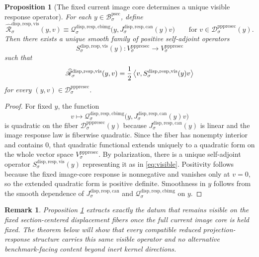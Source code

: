 \documentclass[11pt]{article}
\newcommand{\ProtoSectionBody}[1]{\mathcal B_{#1}^{\mathrm{psec}}}
\newcommand{\PrePreProtoSectionVertical}[1]{V_{#1}^{\mathrm{pppresec}}}
\newcommand{\PrePreProtoSectionResidualBody}[1]{\mathcal D_{#1}^{\mathrm{pppresec}}}
\newcommand{\CanonicalLift}[1]{J_{#1}^{\mathrm{disp,resp,can}}}
\newcommand{\CanonicalImageResponseLaw}[1]{\mathscr Q_{#1}^{\mathrm{disp,resp,cbimg}}}
\newcommand{\CoreForcedBodyResponse}[1]{\widehat{\mathscr R}_{#1}^{\mathrm{disp,resp,vis}}}
\newcommand{\VisibleResponseOperator}[1]{S_{#1}^{\mathrm{disp,resp,vis}}}
\newtheorem{proposition}{Proposition}
\newtheorem{remark}{Remark}
\begin{document}
\begin{proposition}[The fixed current image core determines a unique visible response operator]
\label{prop:visible}
For each \(y\in\ProtoSectionBody{\sigma}\), define
\begin{equation}
\CoreForcedBodyResponse{\sigma}(y,v)
\equiv
\CanonicalImageResponseLaw{\sigma}\bigl(y,\CanonicalLift{\sigma}(y)v\bigr)
\qquad
\text{for }
v\in\PrePreProtoSectionResidualBody{\sigma}(y).
\label{eq:fixedresponse}
\end{equation}
Then there exists a unique smooth family of positive self-adjoint operators
\[
\VisibleResponseOperator{\sigma}(y):
\PrePreProtoSectionVertical{\sigma}\to\PrePreProtoSectionVertical{\sigma}
\]
such that
\begin{equation}
\CoreForcedBodyResponse{\sigma}(y,v)
=
\frac{1}{2}
\ev{v,\VisibleResponseOperator{\sigma}(y)v}
\label{eq:visible}
\end{equation}
for every \((y,v)\in\PrePreProtoSectionResidualBody{\sigma}\).
\end{proposition}

\begin{proof}
For fixed \(y\), the function
\[
v\mapsto \CanonicalImageResponseLaw{\sigma}\bigl(y,\CanonicalLift{\sigma}(y)v\bigr)
\]
is quadratic on the fiber \(\PrePreProtoSectionResidualBody{\sigma}(y)\) because \(\CanonicalLift{\sigma}(y)\) is linear and the image response law is fiberwise quadratic. Since the fiber has nonempty interior and contains \(0\), that quadratic functional extends uniquely to a quadratic form on the whole vector space \(\PrePreProtoSectionVertical{\sigma}\). By polarization, there is a unique self-adjoint operator \(\VisibleResponseOperator{\sigma}(y)\) representing it as in \eqref{eq:visible}. Positivity follows because the fixed image-core response is nonnegative and vanishes only at \(v=0\), so the extended quadratic form is positive definite. Smoothness in \(y\) follows from the smooth dependence of \(\CanonicalLift{\sigma}\) and \(\CanonicalImageResponseLaw{\sigma}\) on \(y\).
\end{proof}

\begin{remark}
Proposition \ref{prop:visible} extracts exactly the datum that remains visible on the fixed section-centered displacement fibers once the full current image core is held fixed. The theorem below will show that every compatible reduced projection-response structure carries this same visible operator and no alternative benchmark-facing content beyond inert kernel directions.
\end{remark}
\end{document}
